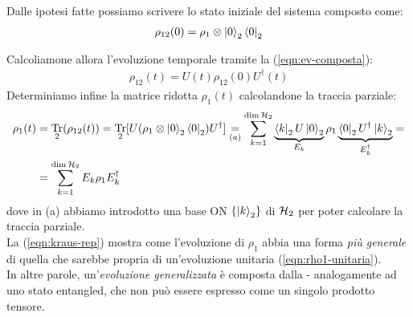 \documentclass[../../InformazioneQuantistica.tex]{subfiles}
\begin{document}
Dalle ipotesi fatte possiamo scrivere lo stato iniziale del sistema composto come:
\begin{align}
 \rho_{12}(0)=\rho_1 \otimes \Ket{0}_2 \Bra{0}_2
\label{eqn:rho-0}
\end{align}

Calcoliamone allora l'evoluzione temporale tramite la (\ref{eqn:ev-composta}):
\begin{align*}
\rho_{12}(t) = U(t) \rho_{12}(0) U^\dag(t)
\end{align*}
Determiniamo infine la matrice ridotta $\rho_1(t)$ calcolandone la traccia parziale:
\begin{align}\nonumber
\rho_1(t) &= \underset{2}{\operatorname{Tr}}(\rho_{12}(t)) = \underset{2}{\operatorname{Tr}} [U(\rho_1 \otimes \Ket{0}_2\Bra{0}_2)U^\dag ] \underset{(a)}{=} \sum_{k=1}^{\operatorname{dim}\mathcal{H}_2} \underbrace{\Bra{k}_2U\Ket{0}_2}_{E_k}\rho_1 \underbrace{\Bra{0}_2U^\dag \Ket{k}_2}_{E_k^\dag} = \\
&= \sum_{k=1}^{\operatorname{dim}\mathcal{H}_2} E_k \rho_1 E_k^\dag
\label{eqn:kraus-rep}
\end{align}
dove in (a) abbiamo introdotto una base ON $\{\Ket{k}_2\}$ di $\mathcal{H}_2$ per poter calcolare la traccia parziale.\\ La (\ref{eqn:kraus-rep}) mostra come l'evoluzione di $\rho_1$ abbia una forma \textit{più generale} di quella che sarebbe propria di un'evoluzione unitaria (\ref{eqn:rho1-unitaria}).\\
In altre parole, un'\textit{evoluzione generalizzata} è composta dalla  - analogamente ad uno stato entangled, che non può essere espresso come un singolo prodotto tensore.\\
\end{document}
